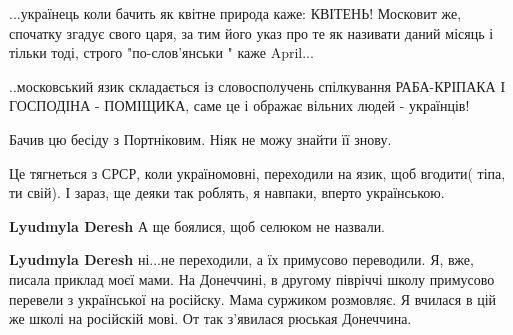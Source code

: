 \begin{itemize}
\begin{itemize}
...українець коли бачить як квітне природа каже: КВІТЕНЬ! Московит же, спочатку
згадує свого царя, за тим його указ про те як називати даний місяць і тільки
тоді, строго "по-слов'янськи " каже April...

..московський язик складається із словосполучень спілкування РАБА-КРІПАКА І
ГОСПОДІНА - ПОМІЩИКА, саме це і ображає вільних людей - українців!


 

Бачив цю бесіду з Портніковим. Ніяк не можу знайти її знову.


\end{itemize}

 

Це тягнеться з СРСР, коли україномовні, переходили на язик, щоб вгодити( тіпа,
ти свій). І зараз, ще деяки так роблять, я навпаки, вперто українською.

\begin{itemize}
 
\textbf{Lyudmyla Deresh} А ще боялися, щоб селюком не назвали.

 
\textbf{Lyudmyla Deresh} ні...не переходили, а їх примусово переводили. Я, вже,
писала приклад моєї мами. На Донеччині, в другому півріччі школу примусово
перевели з української на російску. Мама суржиком розмовляє. Я вчилася в цій же
школі на російскій мові. От так з'явилася рюськая Донеччина.

 

\end{itemize}
\end{itemize}
